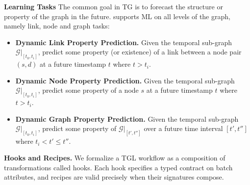\textbf{\name Learning Tasks}
The common goal in TG is to forecast the structure or property of the graph in the future. \name supports ML on all levels of the graph, namely link, node and graph tasks:
\begin{itemize}[leftmargin=*, noitemsep, topsep=0.2pt]
\item \textbf{Dynamic Link Property Prediction.} Given the temporal sub-graph $\mathcal{G}|_{[t_0, t_i]}$, predict some property (or existence) of a link between a node pair $(s,d)$ at a future timestamp $t$ where $t > t_i$.  
\item \textbf{Dynamic Node Property Prediction.} Given the temporal sub-graph $\mathcal{G}|_{[t_0, t_i]}$, predict some property of a node $s$ at a future timestamp $t$ where $t > t_i$.  
\item \textbf{Dynamic Graph Property Prediction.} Given the temporal sub-graph $\mathcal{G}|_{[t_0, t_i]}$, predict some property of $\mathcal{G}|_{[t', t'']}$ over a future time interval $[t', t'']$ where $t_i < t'\leq t''$.
\end{itemize}







\textbf{\name Hooks and Recipes.} We formalize a TGL workflow as a composition of transformations called hooks. Each hook specifies a typed contract on batch attributes, and recipes are valid precisely when their signatures compose. 

